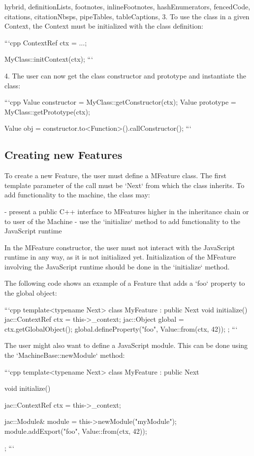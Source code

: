 \begin{markdown*}{%
  hybrid,
  definitionLists,
  footnotes,
  inlineFootnotes,
  hashEnumerators,
  fencedCode,
  citations,
  citationNbsps,
  pipeTables,
  tableCaptions,
}
  3. To use the class in a given Context, the Context must be initialized with the class definition:

```cpp
ContextRef ctx = ...;

MyClass::initContext(ctx);
```

  4. The user can now get the class constructor and prototype and instantiate the class:

```cpp
Value constructor = MyClass::getConstructor(ctx);
Value prototype = MyClass::getPrototype(ctx);

Value obj = constructor.to<Function>().callConstructor();
```

\subsection{Creating new Features}

To create a new Feature, the user must define a MFeature class. The first template parameter of the call must be `Next` from which the class inherits. To add functionality to the machine, the class may:

  - present a public C++ interface to MFeatures higher in the inheritance chain or to user of the Machine
  - use the `initialize` method to add functionality to the JavaScript runtime

In the MFeature constructor, the user must not interact with the JavaScript runtime in any way, as it is not initialized yet. Initialization of the MFeature involving the JavaScript runtime should be done in the `initialize` method.

The following code shows an example of a Feature that adds a `foo` property to the global object:

```cpp
template<typename Next>
class MyFeature : public Next {
    void initialize() {
        jac::ContextRef ctx = this->_context;
        jac::Object global = ctx.getGlobalObject();
        global.defineProperty("foo", Value::from(ctx, 42));
    }
};
```

The user might also want to define a JavaScript module. This can be done using the `MachineBase::newModule` method:

```cpp
template<typename Next>
class MyFeature : public Next {
    void initialize() {
        jac::ContextRef ctx = this->_context;

        jac::Module& module = this->newModule("myModule");
        module.addExport("foo", Value::from(ctx, 42));
    }
};
```


\end{markdown*}